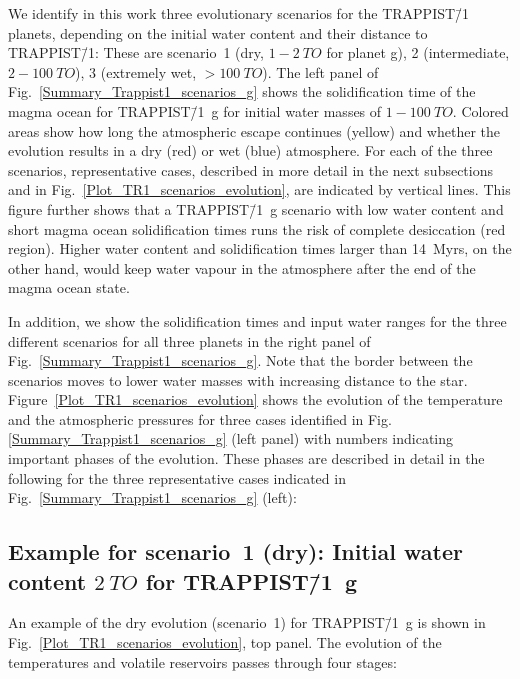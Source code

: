 \documentclass[paper=letterpaper,fontsize=12pt,oneside,twocolumn]{article}
\begin{document}
We identify in this work three evolutionary scenarios for the TRAPPIST\=/1 planets, depending on the initial water content and their distance to TRAPPIST\=/1: These are scenario~1 (dry, $1-\SI{2}{TO}$ for planet g), 2 (intermediate, $2-\SI{100}{TO}$), 3 (extremely wet, $>\SI{100}{TO}$). The left panel of Fig.~\ref{Summary_Trappist1_scenarios_g} shows the solidification time of the magma ocean for TRAPPIST\=/1~g for initial water masses of $1-\SI{100}{TO}$.
Colored areas show how long the atmospheric escape continues (yellow) and whether the evolution results in a dry (red) or wet (blue) atmosphere.
For each of the three scenarios, representative cases, described in more detail in the next subsections and in Fig.~\ref{Plot_TR1_scenarios_evolution}, are indicated by vertical lines. 
This figure further shows that a TRAPPIST\=/1~g scenario with low water content and short magma ocean solidification times runs the risk of complete desiccation (red region). 
Higher water content and solidification times larger than 14~Myrs, on the other hand, would keep water vapour in the atmosphere after the end of the magma ocean state.

In addition, we show the solidification times and input water ranges for the three different scenarios for all three planets in the right panel of Fig.~\ref{Summary_Trappist1_scenarios_g}. 
Note that the border between the scenarios moves to lower water masses with increasing distance to the star.
Figure~\ref{Plot_TR1_scenarios_evolution} shows the evolution of the temperature and the atmospheric pressures for three cases identified in Fig.~ \ref{Summary_Trappist1_scenarios_g} (left panel) with numbers indicating important phases of the evolution.
These phases are described in detail in the following for the three representative cases indicated in Fig.~\ref{Summary_Trappist1_scenarios_g} (left):

\subsection*{Example for scenario~1 (dry): Initial water content $\SI{2}{TO}$ for TRAPPIST\=/1~g}

An example of the dry evolution (scenario~1) for TRAPPIST\=/1~g is shown in Fig.~\ref{Plot_TR1_scenarios_evolution}, top panel. The evolution of the temperatures and volatile reservoirs passes through four stages:
\end{document}
